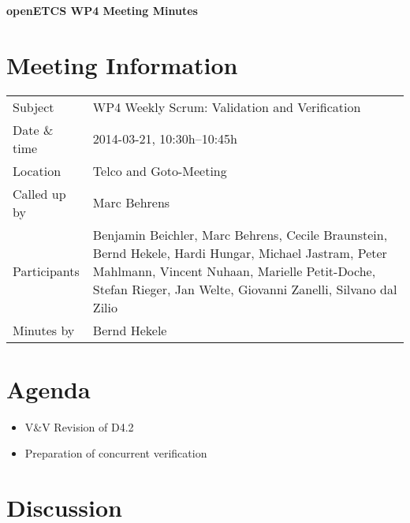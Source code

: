 \documentclass[a4paper, 11pt]{article}
\begin{document}
{\begin{center}\huge\bf openETCS WP4 Meeting Minutes\end{center}}
\section{Meeting Information}

\renewcommand{\arraystretch}{1.5}
\begin{supertabular}{m{.2\textwidth}m{.8\textwidth}}
Subject & WP4 Weekly Scrum: Validation and Verification\\
Date \& time & 2014-03-21, 10:30h--10:45h\\
Location & Telco and Goto-Meeting\\
Called up by & Marc Behrens\\
Participants &
Benjamin Beichler,
Marc Behrens,
Cecile Braunstein,
Bernd Hekele,
Hardi Hungar,
Michael Jastram,
Peter Mahlmann,
Vincent Nuhaan,
Marielle Petit-Doche,
Stefan Rieger,
Jan Welte,
Giovanni Zanelli,
Silvano dal Zilio
\\

Minutes by & Bernd Hekele\\

\end{supertabular}
\renewcommand{\arraystretch}{1.0}


\section{{Agenda}}
\begin{itemize}
\item V\&V Revision of D4.2
\item Preparation of concurrent verification
\end{itemize}

\section{Discussion}
\end{document}
